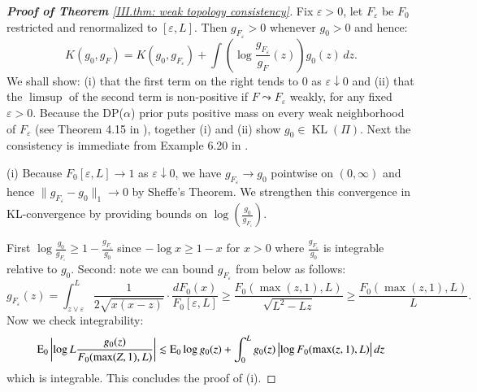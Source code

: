 \begin{proof}[\hypertarget{III.proof consistency in weak topology}{\textbf{Proof of Theorem} \ref{III.thm: weak topology consistency}}]
    Fix $\varepsilon > 0$, let $F_\varepsilon$ be $F_0$ restricted and renormalized to $[\varepsilon, L]$. Then $ g_{\scriptscriptstyle{F_\varepsilon}} > 0$ whenever $g_0 > 0$ and hence:
    \begin{equation}
    K(g_0, g_{\scriptscriptstyle{F}}) = K(g_0,  g_{\scriptscriptstyle{F_\varepsilon}}) + \int \left( \log \frac{ g_{\scriptscriptstyle{F_\varepsilon}}}{g_{\scriptscriptstyle{F}}} (z) \right) g_0(z) \, dz.
    \end{equation}
    We shall show: (i) that the first term on the right tends to 0 as $\varepsilon \downarrow 0$ and (ii) that the $\limsup$ of the second term is non-positive if $F \leadsto F_\varepsilon$ weakly, for any fixed $\varepsilon > 0$. Because the DP($\alpha$) prior puts positive mass on every weak neighborhood of $F_\varepsilon$ (see Theorem 4.15 in \cite{4}), together (i) and (ii) show $g_0 \in \operatorname{KL}(\Pi)$. Next the consistency is immediate from Example 6.20 in \cite{4}.
    
    (i) Because $F_0[\varepsilon, L] \rightarrow 1$ as $\varepsilon \downarrow 0$, we have $ g_{\scriptscriptstyle{F_\varepsilon}} \rightarrow g_0$ pointwise on $(0, \infty)$ and hence $\| g_{\scriptscriptstyle{F_\varepsilon}} - g_0\|_1 \rightarrow 0$ by Sheffe's Theorem. %
    We strengthen this convergence in KL-convergence by providing bounds on $\log \left( \frac{g_0}{ g_{\scriptscriptstyle{F_\varepsilon}}} \right)$.
    
    First $\log \frac{g_0}{ g_{\scriptscriptstyle{F_\varepsilon}}} \geq 1 - \frac{ g_{\scriptscriptstyle{F_\varepsilon}}}{g_0}$ since $-\log x \geq 1 - x$ for $x > 0$ where $\frac{ g_{\scriptscriptstyle{F_\varepsilon}}}{g_0}$ is integrable relative to $g_0$. Second: note we can bound $ g_{\scriptscriptstyle{F_\varepsilon}}$ from below as follows:
    \begin{equation*}
    g_{\scriptscriptstyle{F_\varepsilon}}(z) = \int_{z \vee \varepsilon}^{L} \frac{1}{2 \sqrt{x(x-z)}} \cdot \frac{dF_0(x)}{F_0[\varepsilon, L]} \geq \frac{F_0(\max(z,1), L)}{\sqrt{L^2 - Lz}}\geq \frac{F_0(\max(z,1), L)}{L}.
    \end{equation*}
    Now we check integrability:
    \begin{equation*}
        \mathrm{E}_0 \left| \log L \frac{g_0(z)}{F_0(\max (Z,1), L)} \right| \lesssim  \mathrm{E}_0 \log g_0(z) + \int_0^L g_0(z) \left| \log F_0(\max(z,1), L) \right| dz
    \end{equation*}
    which is integrable. This concludes the proof of (i).


\end{proof}
